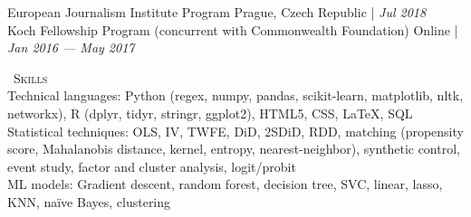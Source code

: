 \documentclass[a4paper,11pt]{article}
\newcommand{\header} [1] {
    \vspace*{2pt}
    {\textsc{\large{\xrfill[0.1ex]{0.5pt}~#1~\xrfill[0.1ex]{0.5pt}}}}
    \vspace*{2pt}
}
\begin{document}
European Journalism Institute Program \hfill Prague, Czech Republic |  \emph{Jul 2018} \\

Koch Fellowship Program (concurrent with Commonwealth Foundation) \hfill Online |  \emph{Jan 2016 --- May 2017}

\vspace{1mm}
\header{Skills} \\
Technical languages: Python (regex, numpy, pandas, scikit-learn, matplotlib, nltk, networkx), R (dplyr, tidyr, stringr, ggplot2), HTML5, CSS, \LaTeX, SQL \\

Statistical techniques: OLS, IV, TWFE, DiD, 2SDiD, RDD, matching (propensity score, Mahalanobis distance, kernel, entropy, nearest-neighbor), synthetic control, event study, factor and cluster analysis, logit/probit \\

ML models: Gradient descent, random forest, decision tree, SVC, linear, lasso, KNN, na\"{i}ve Bayes, clustering
\end{document}
